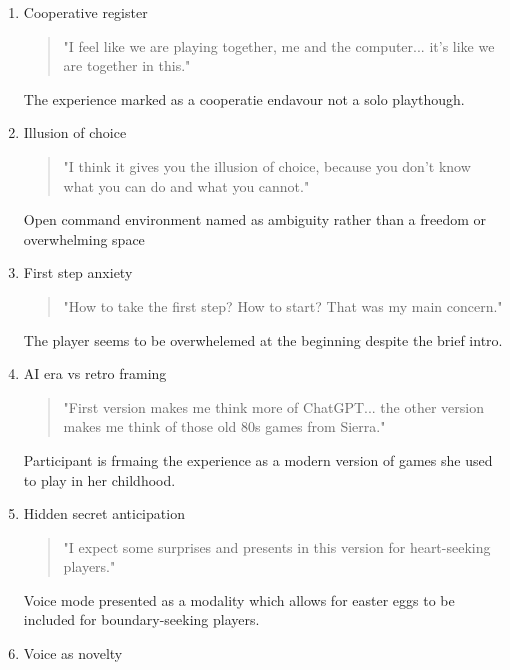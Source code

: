 \begin{enumerate}
    \item Cooperative register
    
        \begin{quote}
            "I feel like we are playing together, me and the computer... it's like we are together in this." 
        \end{quote}
        The experience marked as a cooperatie endavour not a solo playthough. 


    

    \item Illusion of choice
    
        \begin{quote}
            "I think it gives you the illusion of choice, because you don't know what you can do and what you cannot."
        \end{quote}
        Open command environment named as ambiguity rather than a freedom or overwhelming space

        \item First step anxiety
    
        \begin{quote}
            "How to take the first step? How to start? That was my main concern." 
        \end{quote}
        The player seems to be overwhelemed at the beginning despite the brief intro.


        \item AI era vs retro framing
    
        \begin{quote}
            "First version makes me think more of ChatGPT... the other version makes me think of those old 80s games from Sierra."
        \end{quote}
        Participant is frmaing the experience as a modern version of games she used to play in her childhood.


        \item Hidden secret anticipation
    
        \begin{quote}
            "I expect some surprises and presents in this version for heart-seeking players."
        \end{quote}
        Voice mode presented as a modality which allows for easter eggs to be included for boundary-seeking players.


        \item Voice as novelty
    

\end{enumerate}
